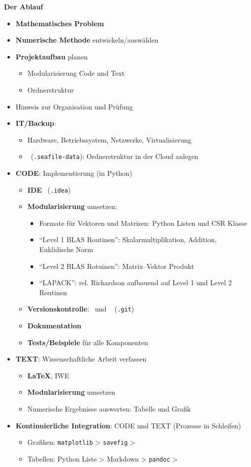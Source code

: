 \clearpage
\textbf{Der Ablauf}
\begin{itemize}
	\item \textbf{Mathematisches Problem}
	\item \textbf{Numerische Methode} entwickeln/auswählen
	\item \textbf{Projektaufbau} planen
	\begin{itemize}
		\item Modularisierung Code und Text
		\item Ordnerstruktur
	\end{itemize}
	\item Hinweis zur Organisation und Prüfung
	\item \textbf{IT/Backup}:
	\begin{itemize}
		\item  Hardware, Betriebssystem, Netzwerke, Virtualisierung
		\item \seafile\ (\texttt{.seafile-data}): Ordnerstruktur in der Cloud anlegen
	\end{itemize}
	\item \textbf{CODE}: Implementierung (in Python)
	\begin{itemize}
		\item \textbf{IDE} \pycharm~(\texttt{.idea})
		\item \textbf{Modularisierung} umsetzen:
		\begin{itemize}
			\item Formate für Vektoren und Matrizen: Python Listen und CSR Klasse
			\item ``Level 1 BLAS Routinen'': Skalarmultiplikation, Addition, Euklidische Norm
			\item ``Level 2 BLAS Rotuinen'': Matrix--Vektor Produkt
			\item ``LAPACK'': rel. Richardson aufbauend auf Level 1 und Level 2 Routinen
		\end{itemize}
		\item {\color{gray}\textbf{Versionskontrolle}: \git\ und \gitlab~ (\texttt{.git})}
		\item \textbf{Dokumentation}
		\item \textbf{Tests/Beispiele} für alle Komponenten
	\end{itemize}
	\item \textbf{TEXT}: Wissenschaftliche Arbeit verfassen
	\begin{itemize}
		\item \textbf{\LaTeX}, IWE \texstudio
		\item \textbf{Modularisierung} umsetzen
		\item Numerische Ergebnisse auswerten: Tabelle und Grafik
	\end{itemize}
	\item {\color{gray}\textbf{Kontinuierliche Integration}: CODE und TEXT (Prozesse in Schleifen)
	\begin{itemize}
		\item Grafiken: \texttt{matplotlib} > \texttt{savefig} > 
		\item Tabellen: Python Liste > Markdown > \texttt{pandoc} > 
	\end{itemize}
}
\end{itemize}
